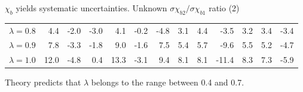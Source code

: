 \begin{frame}{$\chi_b$ yields systematic uncertainties. Unknown $\sigma{\chi_{b2}}/\sigma{\chi_{b1}}$ ratio (2)}
{\begin{tabular}{lrrrrrrrrrrrr}
\rule{0pt}{4ex}$\lambda=0.8$ & 4.4 & -2.0 & -3.0 & 4.1 & -0.2 & -4.8 & 3.1 & 4.4 & -3.5 & 3.2 & 3.4 & -3.4\\
$\lambda=0.9$ & 7.8 & -3.3 & -1.8 & 9.0 & -1.6 & 7.5 & 5.4 & 5.7 & -9.6 & 5.5 & 5.2 & -4.7\\
$\lambda=1.0$ & 12.0 & -4.8 & 0.4 & 13.3 & -3.1 & 9.4 & 8.1 & 8.1 & -11.4 & 8.3 & 7.3 & -5.9\\
\bottomrule
\end{tabular}

}

\begin{block}{}
\centering
Theory predicts that $\lambda$ belongs to the range between 0.4 and 0.7. 
\end{block}

\end{frame}